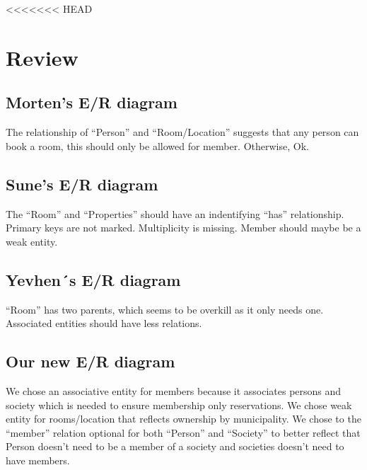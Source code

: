 <<<<<<< HEAD
\section{Review}


\subsection{Morten’s E/R diagram} 
The relationship of ``Person'' and ``Room/Location'' suggests that any person can book a room, this should only be allowed for member. Otherwise, Ok.

\subsection{Sune’s E/R diagram}
The ``Room'' and ``Properties'' should have an indentifying ``has'' relationship.
Primary keys are not marked. Multiplicity is missing. Member should maybe be a weak entity. 


\subsection{Yevhen´s E/R diagram}
``Room'' has two parents, which seems to be overkill as it only needs one. 
Associated entities should have less relations. 

\subsection{Our new E/R diagram}
We chose an associative entity for members because it associates persons and society which is needed 
to ensure membership only reservations.
We chose weak entity for rooms/location that reflects ownership by municipality. 
We chose to the ``member'' relation optional for both ``Person'' and ``Society''
to better reflect that Person doesn't need to be a member of a society and 
societies doesn't need to have members.

\newpage

